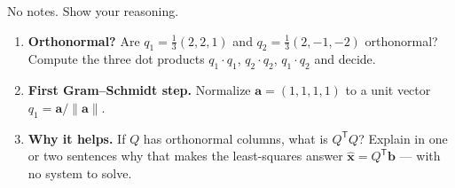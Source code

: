 \documentclass[10pt]{article}
\newcommand{\xx}{\mathbf{x}}
\newcommand{\bb}{\mathbf{b}}
\newcommand{\avec}{\mathbf{a}}
\newcommand{\T}{\mathsf{T}}
\begin{document}
\namedateperiod

\vspace{0.15in}

No notes. Show your reasoning.

\begin{enumerate}[leftmargin=1.8em, itemsep=16pt]
  \item \textbf{Orthonormal?} Are $q_1=\tfrac13(2,2,1)$ and $q_2=\tfrac13(2,-1,-2)$ orthonormal? Compute the
        three dot products $q_1\!\cdot\!q_1$, $q_2\!\cdot\!q_2$, $q_1\!\cdot\!q_2$ and decide.
  \item \textbf{First Gram--Schmidt step.} Normalize $\avec=(1,1,1,1)$ to a unit vector $q_1=\avec/\|\avec\|$.
  \item \textbf{Why it helps.} If $Q$ has orthonormal columns, what is $Q^{\T}Q$? Explain in one or two
        sentences why that makes the least-squares answer $\hat{\xx}=Q^{\T}\bb$ --- with no system to solve.
\end{enumerate}
\end{document}
